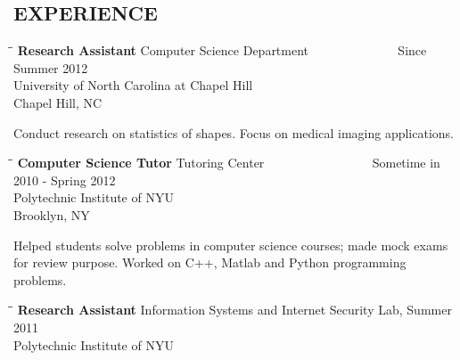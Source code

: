 \documentclass{res}
\begin{document}
\begin{resume}
\section{EXPERIENCE}
   \vspace{-0.1in}	
   \begin{tabbing}
   \hspace{2.3in}\= \hspace{2.6in}\= \kill %
    {\bf Research Assistant} \>Computer Science Department ~~~~~~~~~~~~~  Since Summer 2012\\
    \> University of North Carolina at Chapel Hill  \\
                          \>Chapel Hill, NC
   \end{tabbing}\vspace{-20pt}
    Conduct research on statistics of shapes. Focus on medical imaging applications. 
   \vspace{-0.1in}	
   \begin{tabbing}
   \hspace{2.3in}\= \hspace{2.6in}\= \kill %
    {\bf Computer Science Tutor} \>Tutoring Center ~~~~~~~~~~~~~~~~ Sometime in 2010 - Spring 2012\\
    \> Polytechnic Institute of NYU\\
                          \>Brooklyn, NY
   \end{tabbing}\vspace{-20pt}
    Helped students solve problems in computer science courses; made mock exams for review purpose. Worked on C++, Matlab and Python programming problems.
       \begin{tabbing}
   \hspace{2.3in}\= \hspace{2.6in}\= \kill %
    {\bf Research Assistant} \> Information Systems and Internet Security Lab, Summer 2011 \\
    \>Polytechnic Institute of NYU  \\


\end{tabbing}
\end{resume}
\end{document}
